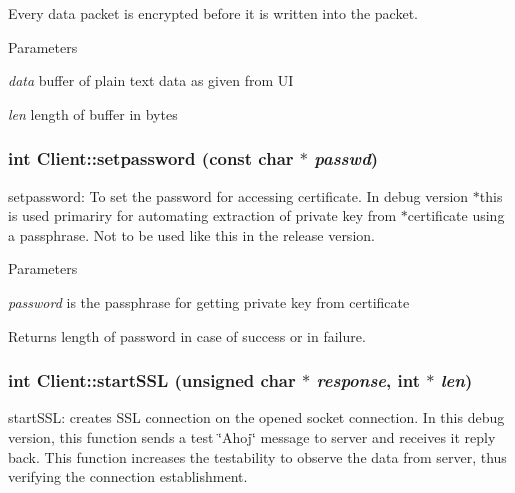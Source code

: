 Every data packet is encrypted before it is written into the packet.


\begin{DoxyParams}{Parameters}
\item[{\em data}]buffer of plain text data as given from UI \item[{\em len}]length of buffer in bytes \end{DoxyParams}
\hypertarget{classClient_aa59c27ce2d1cae55bf03d5ea64c59eef}{
\subsubsection[{setpassword}]{\setlength{\rightskip}{0pt plus 5cm}int Client::setpassword (const char $\ast$ {\em passwd})}}
\label{classClient_aa59c27ce2d1cae55bf03d5ea64c59eef}
setpassword: To set the password for accessing certificate. In debug version $\ast$this is used primariry for automating extraction of private key from $\ast$certificate using a passphrase. Not to be used like this in the release version.


\begin{DoxyParams}{Parameters}
\item[{\em password}]is the passphrase for getting private key from certificate \end{DoxyParams}
\begin{DoxyReturn}{Returns}
length of password in case of success or in failure. 
\end{DoxyReturn}
\hypertarget{classClient_aca61b39a53eadc28d116dcae94b03e15}{
\subsubsection[{startSSL}]{\setlength{\rightskip}{0pt plus 5cm}int Client::startSSL (unsigned char $\ast$ {\em response}, \/  int $\ast$ {\em len})}}
\label{classClient_aca61b39a53eadc28d116dcae94b03e15}
startSSL: creates SSL connection on the opened socket connection. In this debug version, this function sends a test \char`\"{}Ahoj\char`\"{} message to server and receives it reply back. This function increases the testability to observe the data from server, thus verifying the connection establishment.


